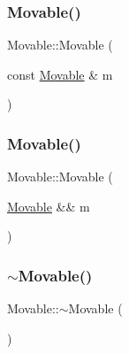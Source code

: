 \mbox{\label{class_movable_a718088f2949b66089c8d6178cec6d96e}} 
\subsubsection{\texorpdfstring{Movable()}{Movable()}\hspace{0.1cm}{\footnotesize\ttfamily [2/3]}}
{\footnotesize\ttfamily Movable\+::\+Movable (\begin{DoxyParamCaption}\item[{const \mbox{\hyperlink{class_movable}{Movable}} \&}]{m }\end{DoxyParamCaption})\hspace{0.3cm}{\ttfamily [inline]}}

\mbox{\label{class_movable_a8c592922bdd171320f54e74a1cf28e2e}} 
\subsubsection{\texorpdfstring{Movable()}{Movable()}\hspace{0.1cm}{\footnotesize\ttfamily [3/3]}}
{\footnotesize\ttfamily Movable\+::\+Movable (\begin{DoxyParamCaption}\item[{\mbox{\hyperlink{class_movable}{Movable}} \&\&}]{m }\end{DoxyParamCaption})\hspace{0.3cm}{\ttfamily [inline]}}

\mbox{\label{class_movable_ac75d653d5762a163b6804d6cccc6fc9c}} 
\subsubsection{\texorpdfstring{$\sim$Movable()}{~Movable()}}
{\footnotesize\ttfamily Movable\+::$\sim$\+Movable (\begin{DoxyParamCaption}{ }\end{DoxyParamCaption})\hspace{0.3cm}{\ttfamily [inline]}}



